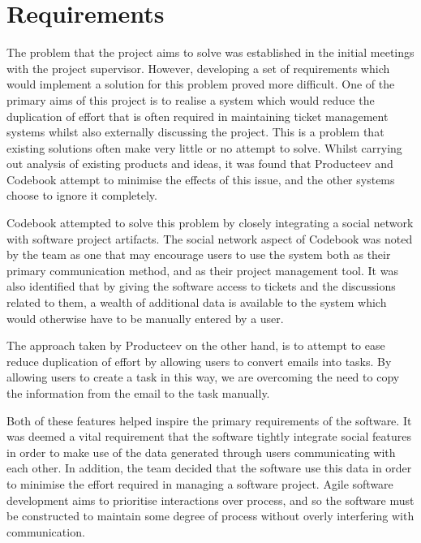 \documentclass[a4paper]{l3proj}
\begin{document}
\section{Requirements}
\label{requirements}

The problem that the project aims to solve was established in the initial meetings with the project supervisor. However, developing a set of requirements which would implement a solution for this problem proved more difficult. One of the primary aims of this project is to realise a system which would reduce the duplication of effort that is often required in maintaining ticket management systems whilst also externally discussing the project. This is a problem that existing solutions often make very little or no attempt to solve. Whilst carrying out analysis of existing products and ideas, it was found that Producteev and Codebook attempt to minimise the effects of this issue, and the other systems choose to ignore it completely.

Codebook attempted to solve this problem by closely integrating a social network with software project artifacts. The social network aspect of Codebook was noted by the team as one that may encourage users to use the system both as their primary communication method, and as their project management tool. It was also identified that by giving the software access to tickets and the discussions related to them, a wealth of additional data is available to the system which would otherwise have to be manually entered by a user.

The approach taken by Producteev on the other hand, is to attempt to ease reduce duplication of effort by allowing users to convert emails into tasks. By allowing users to create a task in this way, we are overcoming the need to copy the information from the email to the task manually.

Both of these features helped inspire the primary requirements of the software. It was deemed a vital requirement that the software tightly integrate social features in order to make use of the data generated through users communicating with each other. In addition, the team decided that the software use this data in order to minimise the effort required in managing a software project. Agile software development aims to prioritise interactions over process, and so the software must be constructed to maintain some degree of process without overly interfering with communication.
\end{document}
